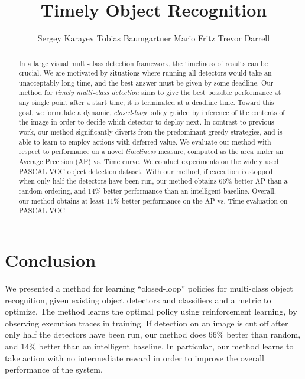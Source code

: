 \documentclass{article} %
\title{Timely Object Recognition}
\author{
Sergey Karayev \And
Tobias Baumgartner \And
Mario Fritz \And
Trevor Darrell
}
\begin{document}
\maketitle

\begin{abstract}
In a large visual multi-class detection framework, the timeliness of results can be crucial.
We are motivated by situations where running all detectors would take an unacceptably long time, and the best answer must be given by some deadline.
Our method for \emph{timely multi-class detection} aims to give the best possible performance at any single point after a start time; it is terminated at a deadline time.
Toward this goal, we formulate a dynamic, \emph{closed-loop} policy guided by inference of the contents of the image in order to decide which detector to deploy next.
In contrast to previous work, our method significantly diverts from the predominant greedy strategies, and is able to learn to employ actions with deferred value.
We evaluate our method with respect to performance on a novel \emph{timeliness} measure, computed as the area under an Average Precision (AP) vs. Time
curve.
We conduct experiments on the widely used PASCAL VOC object detection dataset.
With our method, if execution is stopped when only half the detectors have been run, our method obtains $66\%$ better AP than a random ordering, and $14\%$ better performance than an intelligent baseline.
Overall, our method obtains at least $11\%$ better performance on the AP vs. Time evaluation on PASCAL VOC.
\end{abstract}





\section{Conclusion}
We presented a method for learning ``closed-loop'' policies for multi-class object recognition, given existing object detectors and classifiers and a metric to optimize.
The method learns the optimal policy using reinforcement learning, by observing execution traces in training.
If detection on an image is cut off after only half the detectors have been run, our method does $66\%$ better than random, and $14\%$ better than an intelligent baseline. In particular, our method learns to take action with no intermediate reward in order to improve the overall performance of the system.
\end{document}
